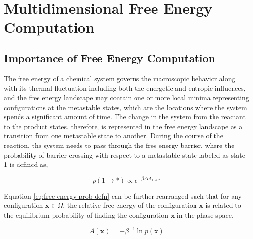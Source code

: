 \chapter{Multidimensional Free Energy Computation}


\begin{spacing}{2.0}
    \section{Importance of Free Energy Computation}
    \label{sec:free-energy-intro}

    The free energy of a chemical system governs the macroscopic behavior along with its thermal fluctuation including both the energetic and 
    entropic influences, and the free energy landscape may contain one or more local minima representing configurations at the metastable states, 
    which are the locations where the system spends a significant amount of time. The change in the system from the reactant to the product states, 
    therefore, is represented in the free energy landscape as a transition from one metastable state to another. During the course of the reaction, 
    the system needs to pass through the free energy barrier, where the probability of barrier crossing with respect to a metastable state labeled as 
    state 1 is defined as,

    \begin{equation}
        p(1\to *) \propto e^{-\beta\Delta A_{1\to *}}
        \label{eq:free-energy-prob-defn}
    \end{equation}

    Equation \ref{eq:free-energy-prob-defn} can be further rearranged such that for any configuration $\mathbf{x} \in \Omega$,  the relative free 
    energy of the configuration $\mathbf{x}$ is related to the equilibrium probability of finding the configuration $\mathbf{x}$ in the phase space,

    \begin{equation}
        A(\mathbf{x}) = -\beta^{-1}\ln p(\mathbf{x})
    \end{equation}


\end{spacing}

